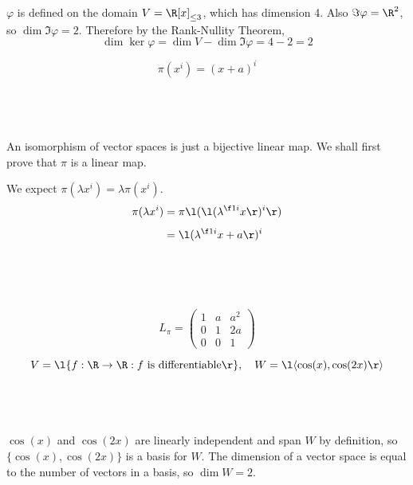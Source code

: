 \documentclass[a4paper]{article}
\begin{document}
$\varphi$ is defined on the domain $V = \R[x]_{\le 3}$, which has dimension 4. Also $\Im \varphi = \R^2$, so $\dim \Im \varphi = 2$. Therefore by the Rank-Nullity Theorem, $$\dim \ker \varphi = \dim V - \dim \Im \varphi = 4 - 2 = 2$$



$$\pi(x^i) = (x+a)^i$$

\subsection{~}

An isomorphism of vector spaces is just a bijective linear map. We shall first prove that $\pi$ is a linear map.

We expect $\pi(\lambda x^i) = \lambda \pi(x^i)$. \begin{align*}
\pi(\lambda x^i) &= \pi\l( \l( \lambda^{\f1i} x \r)^i \r)\\[1ex]
&= \l( \lambda^{\f1i} x + a \r)^i\\[1ex]
\end{align*}


\subsection{~}

$$L_\pi = \begin{pmatrix} 1 & a & a^2\\ 0 & 1 & 2a \\ 0 & 0 & 1 \end{pmatrix}$$



$$V = \l\{ f : \R \to \R : f \text{ is differentiable} \r\}, \quad W = \l\langle \cos(x), \cos(2x) \r\rangle$$

\subsection{~}

$\cos(x)$ and $\cos(2x)$ are linearly independent and span $W$ by definition, so $\{\cos(x), \cos(2x)\}$ is a basis for $W$. The dimension of a vector space is equal to the number of vectors in a basis, so $\dim W = 2$.

\subsection{~}
\end{document}
